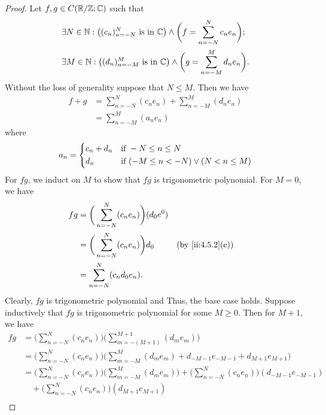 \begin{proof}
  Let \(f, g \in C(\mathbb{R} / \mathbb{Z} ; \mathbb{C})\) such that
  \begin{align*}
     & \exists N \in \mathbb{N} : \big((c_n)_{n = -N}^N \text{ is in } \mathbb{C}\big) \land \bigg(f = \sum_{n = -N}^N c_n e_n\bigg); \\
     & \exists M \in \mathbb{N} : \big((d_n)_{n = -M}^M \text{ is in } \mathbb{C}\big) \land \bigg(g = \sum_{n = -M}^M d_n e_n\bigg).
  \end{align*}
  Without the loss of generality suppose that \(N \leq M\).
  Then we have
  \begin{align*}
    f + g & = \sum_{n = -N}^N (c_n e_n) + \sum_{n = -M}^M (d_n e_n) \\
          & = \sum_{n = -M}^M (a_n e_n)
  \end{align*}
  where
  \[
    a_n = \begin{dcases}
      c_n + d_n & \text{if } -N \leq n \leq N                     \\
      d_n       & \text{if } (-M \leq n < -N) \lor (N < n \leq M)
    \end{dcases}
  \]
  For \(fg\), we induct on \(M\) to show that \(fg\) is trigonometric polynomial.
  For \(M = 0\), we have
  \begin{align*}
    fg & = \bigg(\sum_{n = -N}^N (c_n e_n)\bigg) (d_0 e^0)                       \\
       & = \bigg(\sum_{n = -N}^N (c_n e_n)\bigg) d_0       &  & \by{ii:4.5.2}[e] \\
       & = \sum_{n = -N}^N (c_n d_0 e_n).
  \end{align*}
  Clearly, \(fg\) is trigonometric polynomial and Thus, the base case holds.
  Suppose inductively that \(fg\) is trigonometric polynomial for some \(M \geq 0\).
  Then for \(M + 1\), we have
  \begin{align*}
    f g & = \bigg(\sum_{n = -N}^N (c_n e_n)\bigg) \bigg(\sum_{m = -(M + 1)}^{M + 1} (d_m e_m)\bigg)                                                        \\
        & = \bigg(\sum_{n = -N}^N (c_n e_n)\bigg) \bigg(\sum_{m = -M}^M (d_m e_m) + d_{-M - 1} e_{-M - 1} + d_{M + 1} e_{M + 1}\bigg)                      \\
        & = \bigg(\sum_{n = -N}^N (c_n e_n)\bigg) \bigg(\sum_{m = -M}^M (d_m e_m)\bigg) + \bigg(\sum_{n = -N}^N (c_n e_n)\bigg) (d_{-M - 1} e_{-M - 1})    \\
        & \quad + \bigg(\sum_{n = -N}^N (c_n e_n)\bigg) (d_{M + 1} e_{M + 1})                                                                              \\

\end{align*}
\end{proof}

